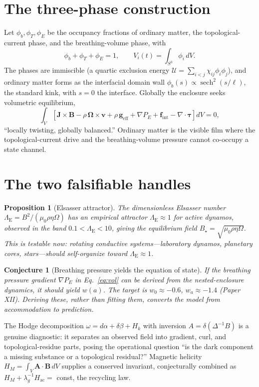 \documentclass[11pt]{article}
\newtheorem{proposition}[theorem]{Proposition}
\newtheorem{conjecture}[theorem]{Conjecture}
\theoremstyle{remark}
\newcommand{\Els}{\Lambda_{\mathrm{E}}}
\begin{document}
\section{The three-phase construction}
Let $\phi_b, \phi_T, \phi_E$ be the occupancy fractions of ordinary matter, the topological-current phase, and the breathing-volume phase, with
\begin{equation}
\phi_b + \phi_T + \phi_E = 1, \qquad V_i(t) = \int_{S^3}\phi_i\,dV.
\end{equation}
The phases are immiscible (a quartic exclusion energy $\mathcal{U} = \sum_{i<j}\chi_{ij}\phi_i\phi_j$), and ordinary matter forms as the interfacial domain wall $\phi_b(s) \propto \operatorname{sech}^2(s/\ell)$, the standard kink, with $s = 0$ the interface. Globally the enclosure seeks volumetric equilibrium,
\begin{equation}
\int_V\!\left[\mathbf{J}\times\mathbf{B} - \rho\,\bm{\Omega}\times\mathbf{v} + \rho\,\mathbf{g}_{\mathrm{eff}} + \nabla P_E + \mathbf{f}_{\mathrm{int}} - \nabla\!\cdot\bm{\tau}\right]dV = 0,
\label{eq:vol}
\end{equation}
``locally twisting, globally balanced.'' Ordinary matter is the visible film where the topological-current drive and the breathing-volume pressure cannot co-occupy a state channel.
\section{The two falsifiable handles}
\begin{proposition}[Elsasser attractor]
The dimensionless Elsasser number $\Els = B^2/(\mu_0\rho\eta\Omega)$ has an empirical attractor $\Els \approx 1$ for active dynamos, observed in the band $0.1 < \Els < 10$, giving the equilibrium field $B_\star = \sqrt{\mu_0\rho\eta\Omega}$. This is testable now: rotating conductive systems---laboratory dynamos, planetary cores, stars---should self-organize toward $\Els \approx 1$.
\end{proposition}
\begin{conjecture}[Breathing pressure yields the equation of state]
If the breathing pressure gradient $\nabla P_E$ in Eq.~\eqref{eq:vol} can be derived from the nested-enclosure dynamics, it should yield $w(a)$. The target is $w_0 \approx -0.6$, $w_a \approx -1.4$ (Paper XII). Deriving these, rather than fitting them, converts the model from accommodation to prediction.
\end{conjecture}
The Hodge decomposition $\omega = d\alpha + \delta\beta + H_k$ with inversion $A = \delta(\Delta^{-1}B)$ is a genuine diagnostic: it separates an observed field into gradient, curl, and topological-residue parts, posing the operational question ``is the dark component a missing substance or a topological residual?'' Magnetic helicity $H_M = \int_V \mathbf{A}\cdot\mathbf{B}\,dV$ supplies a conserved invariant, conjecturally combined as $H_M + \lambda_g^{-1}H_{\mathrm{ac}} = $ const, the recycling law.
\end{document}
